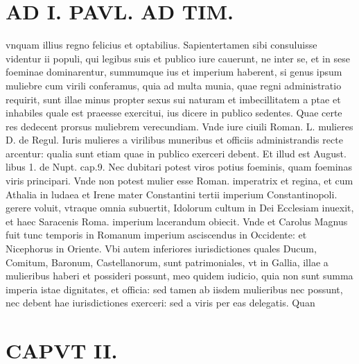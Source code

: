 \documentclass{article}
\begin{document}
\begin{pages}
\section*{AD I. PAVL. AD TIM. }
\marginpar{[ p.86 ]}\pstart vnquam illius regno felicius et optabilius. Sapientertamen sibi consuluisse videntur ii populi, qui legibus suis et publico iure cauerunt, ne inter se, et in sese foeminae dominarentur, summumque ius et imperium haberent, si genus ipsum muliebre cum virili conferamus, quia ad multa munia, quae regni administratio requirit, sunt illae minus propter sexus sui naturam et imbecillitatem a ptae et inhabiles quale est praeesse exercitui, ius dicere in publico sedentes. Quae certe res dedecent prorsus muliebrem verecundiam. Vnde iure ciuili Roman. L. mulieres D. de Regul. Iuris mulieres a virilibus muneribus et officiis administrandis recte arcentur: qualia sunt etiam quae in publico exerceri debent. Et illud est August. libus 1. de Nupt. cap.9. Nec dubitari potest viros potius foeminis, quam foeminas viris principari. Vnde non potest mulier esse Roman. imperatrix et regina, et cum Athalia in ludaea et Irene mater Constantini tertii imperium Constantinopoli. gerere voluit, vtraque omnia subuertit, Idolorum cultum in Dei Ecclesiam inuexit, et haec Saracenis Roma. imperium lacerandum obiecit. Vnde et Carolus Magnus fuit tunc temporis in Romanum imperium asciscendus in Occidente: et Nicephorus in Oriente. Vbi autem inferiores iurisdictiones quales Ducum, Comitum, Baronum, Castellanorum, sunt patrimoniales, vt in Gallia, illae a mulieribus haberi et possideri possunt, meo quidem iudicio, quia non sunt summa imperia istae dignitates, et officia: sed tamen ab iisdem mulieribus nec possunt, nec debent hae iurisdictiones exerceri: sed a viris per eas delegatis. Quan\pend
\section*{CAPVT  II. }
\marginpar{[ p.87 ]}\pstart {}
{}

\end{pages}
\end{document}

